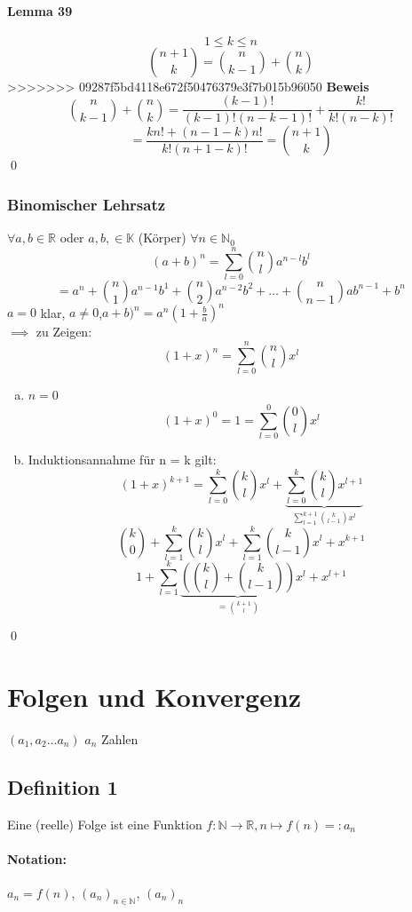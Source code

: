 \documentclass[fleqn]{scrbook}
\newcommand{\R}{\mathbb{R}}
\newcommand{\N}{\mathbb{N}}
\renewenvironment{proof}{{\bfseries Beweis }}{\qed}
\begin{document}
\subsubsection{Lemma 39} \[1 \leq k \leq n\] \[\binom{n+1}{k} = \binom {n}{k-1} + \binom{n}{k}\]
>>>>>>> 09287f5bd4118e672f50476379e3f7b015b96050
\begin{proof}
	\[ \binom {n}{k-1} + \binom{n}{k} = \frac{(k-1)!}{(k-1)!(n-k-1)!} + \frac{k!}{k!(n-k)!}\]
	\[ = \frac{kn! + (n -1 -k)n!}{k!(n+1-k)!} = \binom{n+1}{k}\]
\end{proof}
\subsection{Binomischer Lehrsatz} $\forall a,b \in \R$ oder $a,b, \in \mathbb{K}$ (Körper) $\forall n \in \N_0$
	\[(a+b)^n = \sum_{l=0}^n \binom{n}{l} a^{n-l}b^l\]
	\[=a^n + \binom{n}{1}a^{n-1}b^1+\binom{n}{2}a^{n-2}b^2+\ldots+\binom{n}{n-1}ab^{n-1}+b^n\]
	\begin{proof}
	$a = 0$ klar, $a \neq 0$,$a+b)^n = a^n(1 + \frac{b}{a})^n$\\
				$\implies$ zu Zeigen: \[(1 + x)^n = \sum_{l =0}^n \binom{n}{l} x^l\]
		\begin{enumerate}[a)]
			\item $n = 0$
				\[(1 + x)^0 = 1 = \sum_{l=0}^0 \binom{0}{l}x^l\]
			\item Induktionsannahme für n = k gilt:
				\[(1+x)^{k+1} = \sum_{l=0}^k \binom{k}{l}x^l+\underbrace{\sum_{l=0}^k\binom{k}{l}x^{l+1}}_{\sum_{l=1}^{k+1}\binom{k}{l-1}x^l}\]
				\[\binom{k}{0} + \sum_{l=1}^k \binom{k}{l}x^l + \sum_{l=1}^k \binom{k}{l-1}x^l + x^{k+1} \]
				\[1+\sum_{l=1}^k\underbrace{\left(\binom{k}{l}+\binom{k}{l-1}\right)}_{=\binom{k+1}{l}}x^l + x^{l+1}\]
		\end{enumerate}
	\end{proof}
\chapter{Folgen und Konvergenz} $(a_1, a_2 \ldots a_n)$ $a_n$ Zahlen

\section{Definition 1} 


Eine (reelle) Folge ist eine Funktion $f: \N \rightarrow \R, n \mapsto f(n) =: a_n$

\subsubsection{Notation:} $a_n = f(n)$, $(a_n)_{n \in \N}$, $(a_n)_n$
\end{document}
